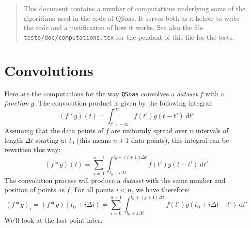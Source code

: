 \documentclass{article}
\newcommand{\dd}{\mathrm{d}}
\begin{document}
\begin{abstract}
  This document contains a number of computations underlying some of
  the algorithms used in the code of QSoas. It serves both as a helper
  to write the code and a justification of how it works. See also the
  file \texttt{tests/doc/computations.tex} for the pendant of this
  file for the tests.
\end{abstract}

\section{Convolutions}

Here are the computations for the way \texttt{QSoas} convolves a
\emph{dataset} $f$ with a \emph{function} $g$. The convolution product
is given by the following integral:
%
\begin{equation}
  (f*g)(t) = \int_{t' = -\infty}^{\infty} f(t') g(t-t')\:\dd t'
\end{equation}
%
Assuming that the data points of $f$ are uniformly spread over $n$
intervals of length $\Delta t$ starting at $t_0$ (this means $n+1$
data points), this integral can be rewritten this way:
%
\begin{equation}
  (f*g)(t) = \sum_{i = 0}^{n-1}
  \int_{t_0 + i \Delta t}^{t_0 + (i+1) \Delta t}
  f(t') g(t-t')\:\dd t'
\end{equation}
%
The convolution process will produce a \emph{dataset} with the same
number and position of points as $f$. For all points $i < n$, we have
therefore:
%
\begin{equation}
  (f*g)_i = (f*g)(t_0 + i\Delta i) = 
  \sum_{i = 0}^{n-1} \int_{t_0 + j \Delta t}^{t_0 + (j+1) \Delta t}
  f(t') g(t_0 + i\Delta t-t')\:\dd t'
\end{equation}
%
We'll look at the last point later.
\end{document}
